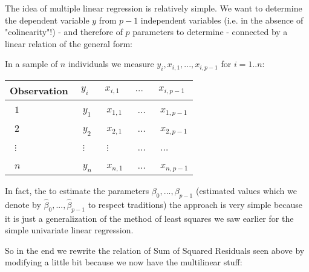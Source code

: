 	The idea of multiple linear regression is relatively simple. We want to determine the dependent variable $y$ from $p-1$ independent variables (i.e. in the absence of "colinearity"!) - and therefore of $p$ parameters to determine - connected by a linear relation of the general form:
	
	In a sample of $n$ individuals we measure $y_i,x_{i,1},...,x_{i,p-1}$ for $i=1..n$:
	\begin{table}[H]
	\begin{center}
			\begin{tabular}{|p{2cm}|p{2cm}|p{2cm}|p{2cm}|p{2cm}|}
				\hline
				\multicolumn{1}{c}{\cellcolor{black!30}\textbf{Observation}} & 
  \multicolumn{1}{c}{\cellcolor{black!30}\textbf{$y_i$}}  & \multicolumn{1}{c}{\cellcolor{black!30}\textbf{$x_{i,1}$}} & \multicolumn{1}{c}{\cellcolor{black!30}\textbf{$\ldots$}} & \multicolumn{1}{c}{\cellcolor{black!30}\textbf{$x_{i,p-1}$}} \\ \hline
				\centering\arraybackslash\ $1$ & \centering\arraybackslash\ $y_1$ & \centering\arraybackslash\ $x_{1,1}$ & \centering\arraybackslash\ $\ldots$ & \centering\arraybackslash\ $x_{1,p-1}$ \\ \hline
				\centering\arraybackslash\ $2$ & \centering\arraybackslash\ $y_2$ & \centering\arraybackslash\ $x_{2,1}$ & \centering\arraybackslash\ $\ldots$ & \centering\arraybackslash\ $x_{2,p-1}$ \\ \hline
				\centering\arraybackslash\ $\vdots$ & \centering\arraybackslash\ $\vdots$ & \centering\arraybackslash\ $\vdots$ & \centering\arraybackslash\ $\ldots$  & \centering\arraybackslash\ $\ldots$\\ \hline
				\centering\arraybackslash\ $n$ & \centering\arraybackslash\ $y_n$ & \centering\arraybackslash\ $x_{n,1}$ & \centering\arraybackslash\ $\ldots$ & \centering\arraybackslash\ $x_{n,p-1}$ \\ \hline
		\end{tabular}
	\end{center}
	\end{table}
	In fact, the to estimate the parameters $\beta_0,...,\beta_{p-1}$ (estimated values which we denote by $\hat{\beta}_0,...,\hat{\beta}_{p-1}$ to respect traditions) the approach is very simple because it is just a generalization of the method of least squares we saw earlier for the simple univariate linear regression.
	
	So in the end we rewrite the relation of Sum of Squared Residuals seen above by modifying a little bit because we now have the multilinear stuff:
	
